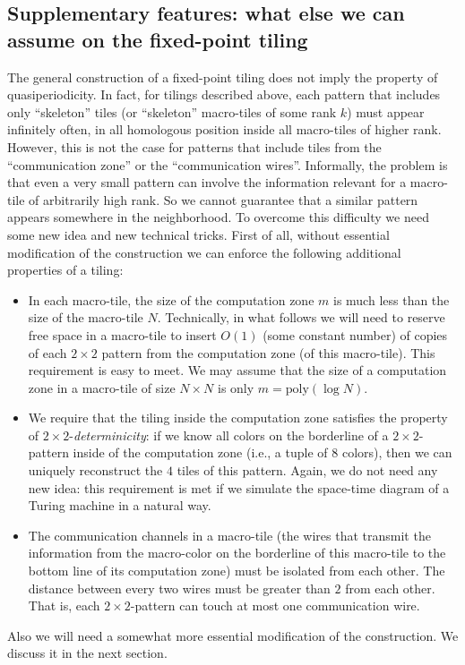 \documentclass[runningheads]{llncs}
\newcommand{\poly}{\mathrm{poly}}
\begin{document}
 
 \subsection{Supplementary features: what else we can assume on the fixed-point tiling}
 
The general construction of a fixed-point tiling does not imply the property of quasiperiodicity. In fact, for tilings described above, each pattern that includes only ``skeleton'' tiles (or ``skeleton'' macro-tiles of some rank $k$) must appear infinitely often, in all homologous position inside all macro-tiles of higher rank. However, this is not the case for patterns that include tiles from the ``communication zone'' or the ``communication wires''. Informally, the problem is that  even a very small  pattern can involve the information relevant for a macro-tile of arbitrarily high rank. So we cannot guarantee that a similar pattern appears somewhere in the  neighborhood.  To overcome this difficulty we need some new idea and new technical tricks.
First of all, without essential modification of the construction we can enforce the following additional properties of a tiling:
\begin{itemize}
\item In each macro-tile, the size of the computation zone $m$ is much less than the size of the macro-tile $N$.  Technically, in what follows we will need to reserve free space in a macro-tile to insert $O(1)$ (some constant number) of copies of each $2\times 2$ pattern  from the computation zone (of this macro-tile). This requirement is easy to meet.
We may  assume that the size of a computation zone in a macro-tile of size $N\times N$ is only $m=\poly(\log N)$. 
\item We require that the tiling inside the computation zone   satisfies the property of $2\times2$-\emph{determinicity}:  if we know all  colors  on the borderline of a $2\times2$-pattern inside of the computation zone (i.e., a tuple of $8$ colors), then we can uniquely reconstruct the $4$ tiles of this pattern. Again, we do not need any new idea: this requirement is met if we simulate the space-time diagram of a Turing machine in a natural way.
\item The communication channels in a macro-tile   (the wires that transmit the information from the macro-color on the borderline of this macro-tile to the bottom line of its computation zone) must be isolated from each other. The distance between every two wires must be greater than $2$ from each other. That is, each $2\times 2$-pattern   can touch at most one communication wire.
\end{itemize} 
Also we will need a somewhat more essential modification of the construction. We discuss it in the next section.
\end{document}
